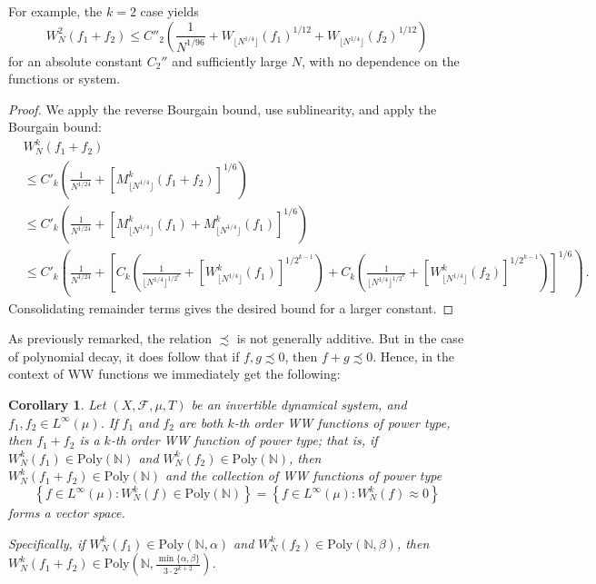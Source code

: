 \documentclass[11pt, oneside]{amsart}   	%
\newcommand{\1}{\mathbbm{1}}
\newcommand{\N}{\mathbb{N}}
\newcommand{\floor}[1]{\lfloor#1\rfloor}
\newtheorem{corollary}[theorem]{Corollary}
\theoremstyle{definition}
\begin{document}
For example, the $k=2$ case yields
$$W_N^2(f_1 + f_2) \leq C''_2\left( \frac{1}{N^{1/96}} + W_{\floor{N^{1/4}}} (f_1)^{1/12} + W_{\floor{N^{1/4}}} (f_2)^{1/12} \right)$$
for an absolute constant $C_2''$ and sufficiently large $N$, with no dependence on the functions or system.


\begin{proof}
We apply the reverse Bourgain bound, use sublinearity, and apply the Bourgain bound:
\begin{align*}
&W_N^k(f_1 + f_2) \\ &\leq C'_k\left(\frac{1}{N^{1/24}} + \left[M_{\floor{N^{1/4}}}^k(f_1 + f_2)\right]^{1/6} \right) \\
&\leq C'_k\left(\frac{1}{N^{1/24}} + \left[M_{\floor{N^{1/4}}}^k(f_1) + M_{\floor{N^{1/4}}}^k(f_1)\right]^{1/6} \right) \\
&\leq C'_k\left(\frac{1}{N^{1/24}} + \left[ C_{k} \left( \frac{1}{\floor{N^{1/4}}^{1/2^k}} + \left[W_{\floor{N^{1/4}}}^k (f_1)\right]^{1/2^{k-1}} \right) + C_{k} \left( \frac{1}{\floor{N^{1/4}}^{1/2^k}} + \left[W_{\floor{N^{1/4}}}^k (f_2)\right]^{1/2^{k-1}} \right) \right]^{1/6} \right) \, .
\end{align*}
Consolidating remainder terms gives the desired bound for a larger constant.
\end{proof}

As previously remarked, the relation $\precsim$ is not generally additive. But in the case of polynomial decay, it does follow that if $f, g \precsim 0$, then $f + g \precsim 0$. Hence, in the context of WW functions we immediately get the following:

\begin{corollary}
Let $(X, \mathcal{F}, \mu, T)$ be an invertible dynamical system, and $f_1, f_2 \in L^\infty(\mu)$. If $f_1$ and $f_2$ are both $k$-th order WW functions of power type, then $f_1 + f_2$ is a $k$-th order WW function of power type; that is, if $W_N^k (f_1)\in \text{Poly}(\N)$ and $W_N^k (f_2)\in \text{Poly}(\N)$, then $W_N^k (f_1+f_2)\in \text{Poly}(\N)$ and the collection of WW functions of power type
$$\left\{f\in L^\infty(\mu) : W_N^k(f) \in \text{Poly}(\N)\right\} = \left\{f\in L^\infty(\mu) : W_N^k(f) \approx 0\right\}$$
forms a vector space.

Specifically, if  $W_N^k (f_1)\in \text{Poly}(\N, \alpha)$ and $W_N^k (f_2)\in \text{Poly}(\N, \beta)$, then $W_N^k (f_1+f_2)\in \text{Poly}\left(\N, \frac{\min\{\alpha, \beta\}}{3\cdot 2^{k+2}}\right)$.
\end{corollary}
\end{document}
